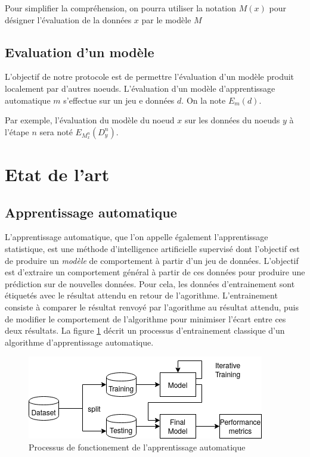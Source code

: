 \documentclass[stage3a]{tnreport} %
\begin{document}
Pour simplifier la compréhension, on pourra utiliser la notation $M(x)$ pour désigner l'évaluation de la données $x$
par le modèle $M$


\subsection{Evaluation d'un modèle}

L'objectif de notre protocole est de permettre l'évaluation d'un modèle produit localement par d'autres noeuds. L'évaluation d'un modèle d'apprentissage automatique $m$ s'effectue sur un jeu e données $d$. On la note $E_m(d)$. 

Par exemple, l'évaluation du modèle du noeud $x$ sur les données du noeuds $y$ à l'étape $n$ sera noté $E_{M_x^n}(D_y^n)$.


\section{Etat de l'art}

\subsection{Apprentissage automatique}

L'apprentissage automatique, que l'on appelle également l'apprentissage statistique, est une méthode d'intelligence artificielle supervisé dont l'objectif est de produire un \textit{modèle} de comportement à partir d'un jeu de données. L'objectif est d'extraire un comportement général à partir de ces données pour produire une prédiction sur de nouvelles données. Pour cela, les données d'entrainement sont étiquetés avec le résultat attendu en retour de l'agorithme. L'entrainement consiste à comparer le résultat renvoyé par l'agorithme au résultat attendu, puis de modifier le comportement de l'algorithme pour minimiser l'écart entre ces deux résultats. La figure \ref{fig:machine_learning_workflow} décrit un processus d'entrainement classique d'un algorithme d'apprentissage automatique.


\begin{figure}[]
  \centering
  \includegraphics[scale=0.8]{figures/machine_workflow.png}
  \caption{Processus de fonctionement de l'apprentissage automatique}
  \label{fig:machine_learning_workflow}
\end{figure}
\end{document}
